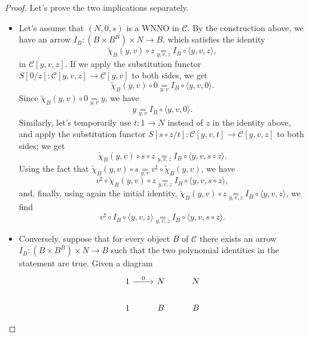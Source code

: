 \begin{proof}
    Let's prove the two implications separately.
    \begin{itemize}
        \item[$\boxed{\Longrightarrow}$] Let's assume that $(N,0,s)$ is a WNNO in $\mathcal{C}$. By the construction above, we have an arrow $I_B : (B \times B^B) \times N \to B$, which satisfies the identity
        \[ \widetilde{\chi}_B(y,v) \circ z \underset{y,v,z}{=} I_B \circ \langle y,v,z\rangle, \]
        in $\mathcal{C}[y,v,z]$. If we apply the substitution functor $S[0/z] : \mathcal{C}[y,v,z] \to \mathcal{C}[y,v]$ to both sides, we get
        \[ \widetilde{\chi}_B(y,v) \circ 0 \underset{y,v}{=} I_B \circ \langle y,v,0\rangle. \]
        Since $\widetilde{\chi}_B(y,v) \circ 0 \underset{y,v}{=} y$, we have
        \[ y \underset{y,v}{=} I_B \circ \langle y,v,0\rangle. \]
        Similarly, let's temporarily use $t : 1 \to N$ instead of $z$ in the identity above, and apply the substitution functor $S[s \circ z/t] : \mathcal{C}[y,v,t] \to \mathcal{C}[y,v,z]$ to both sides; we get
        \[ \widetilde{\chi}_B(y,v) \circ s \circ z \underset{y,v,z}{=} I_B \circ \langle y,v,s \circ z\rangle. \]
        Using the fact that $\widetilde{\chi}_B(y,v) \circ s \underset{y,v}{=} v^\sharp \circ \widetilde{\chi}_B(y,v)$, we have
        \[ v^\sharp \circ \widetilde{\chi}_B(y,v) \circ z \underset{y,v,z}{=} I_B \circ \langle y,v,s \circ z\rangle, \]
        and, finally, using again the initial identity, $\widetilde{\chi}_B(y,v) \circ z \underset{y,v,z}{=} I_B \circ \langle y,v,z\rangle$, we find
        \[ v^\sharp \circ I_B \circ \langle y,v,z\rangle \underset{y,v,z}{=} I_B \circ \langle y,v,s \circ z\rangle. \]
        \item[$\boxed{\Longleftarrow}$] Conversely, suppose that for every object $B$ of $\mathcal{C}$ there exists an arrow $I_B : (B \times B^B) \times N \to B$ such that the two polynomial identities in the statement are true.
        Given a diagram
        \[\begin{tikzcd}
            1 & N & N \\
            1 & B & B
            \arrow["0", from=1-1, to=1-2]

\end{tikzcd}\]
\end{itemize}
\end{proof}
